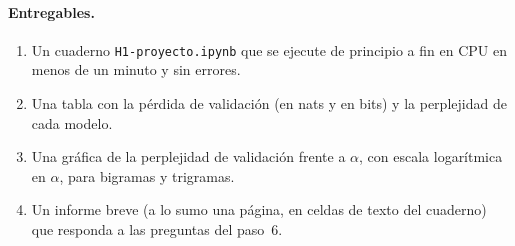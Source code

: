 \paragraph{Entregables.}
\begin{enumerate}[label=\arabic*.]
  \item Un cuaderno \texttt{H1-proyecto.ipynb} que se ejecute de principio a fin en CPU en menos de un minuto y sin errores.
  \item Una tabla con la pérdida de validación (en nats y en bits) y la perplejidad de cada modelo.
  \item Una gráfica de la perplejidad de validación frente a $\alpha$, con escala logarítmica en $\alpha$, para bigramas y trigramas.
  \item Un informe breve (a lo sumo una página, en celdas de texto del cuaderno) que responda a las preguntas del paso~6.
\end{enumerate}

